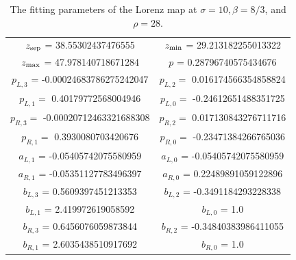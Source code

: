 \begin{table}[H]
    \centering
    \begin{tabular}{|c|c|}
    \hline 
         $z_{\rm sep}$ = 38.55302437476555 &
         $z_{\rm min}$ =  29.213182255013322 \\ 
         $z_{\rm max}$ =  47.978140718671284 & 
         $p$ = 0.28796740575434676   \\
         $p_{L,3}$ = -0.00024683786275242047 & $p_{L,2} = $ 
         0.016174566354858824 \\
         $p_{L,1} = $ 0.40179772568004946 & 
         $p_{L, 0}  = $ -0.24612651488351725 \\
         $p_{R,3} = $ -0.00020712463321688308 & 
         $p_{R,2} = $ 0.017130843276711716 \\
         $p_{R, 1} = $ 0.3930080703420676 & 
         $p_{R, 0} = $ -0.23471384266765036 \\
         $a_{L,1}$ = -0.05405742075580959 & $a_{L,0}$ = -0.05405742075580959 \\
         $a_{R,1}$ = -0.05351127783496397 & $a_{R,0}$ = 0.22489891059122896 \\
         $b_{L,3}$ = 0.5609397451213353 & $b_{L,2}$ = -0.3491184293228338 \\  $b_{L,1}$ = 2.419972619058592 & $b_{L,0}$ = 1.0 \\
         $b_{R,3}$ = 0.6456076059873844 & $b_{R,2}$ = -0.34840383986411055 \\ $b_{R,1}$ = 2.6035438510917692 &  $b_{R,0}$ = 1.0 \\
         \hline
    \end{tabular}
    \caption{The fitting parameters of the Lorenz map at $\sigma = 10, \beta = 8/3$, and $\rho = 28.$}
    \label{tab:lorenzFit}
\end{table}

